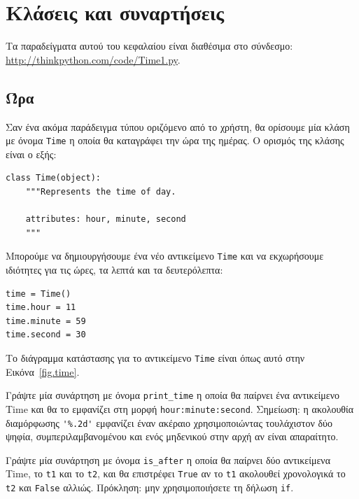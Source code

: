 \documentclass[10pt]{book}
\begin{document}
\chapter{Κλάσεις και συναρτήσεις}
\label{time}

Τα παραδείγματα αυτού του κεφαλαίου είναι διαθέσιμα στο σύνδεσμο:
\url{http://thinkpython.com/code/Time1.py}.

 
\section{Ώρα}
\label{time.object}

Σαν ένα ακόμα παράδειγμα τύπου οριζόμενο από το χρήστη, θα ορίσουμε μία κλάση με όνομα {\tt Time} η οποία
θα καταγράφει την ώρα της ημέρας. Ο ορισμός της κλάσης είναι ο εξής: 

\begin{verbatim}
class Time(object):
    """Represents the time of day.

    attributes: hour, minute, second
    """
\end{verbatim}
%
Μπορούμε να δημιουργήσουμε ένα νέο αντικείμενο {\tt Time} και να εκχωρήσουμε ιδιότητες για τις ώρες, τα λεπτά
και τα δευτερόλεπτα:

\begin{verbatim}
time = Time()
time.hour = 11
time.minute = 59
time.second = 30
\end{verbatim}
%
Το διάγραμμα κατάστασης για το αντικείμενο {\tt Time} είναι όπως αυτό στην Εικόνα~\ref{fig.time}.
\\

 
\begin{exercise}
\label{ex.printtime}

Γράψτε μία συνάρτηση με όνομα \verb"print_time" η οποία θα παίρνει ένα αντικείμενο Time και θα το εμφανίζει 
στη μορφή {\tt hour:minute:second}. Σημείωση: η ακολουθία διαμόρφωσης \verb"'%.2d'" εμφανίζει έναν ακέραιο χρησιμοποιώντας τουλάχιστον δύο ψηφία, συμπεριλαμβανομένου και ενός μηδενικού στην αρχή αν είναι απαραίτητο.
\\
\end{exercise}

\begin{exercise}
\label{isafter}

Γράψτε μία συνάρτηση με όνομα \verb"is_after" η οποία θα παίρνει δύο αντικείμενα Time, το {\tt t1}
και το {\tt t2}, και θα επιστρέφει {\tt True} αν το {\tt t1} ακολουθεί χρονολογικά το {\tt t2} και
{\tt False} αλλιώς. Πρόκληση: μην χρησιμοποιήσετε τη δήλωση {\tt if}.
\end{exercise}
\end{document}

